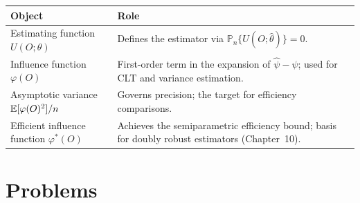 \documentclass[master.tex]{subfiles}
\begin{document}
\begin{tcolorbox}[defstyle, title={Key Objects in This Chapter}]
\begin{center}
\renewcommand{\arraystretch}{1.5}
\begin{tabular}{p{4.5cm} p{8cm}}
\toprule
\textbf{Object} & \textbf{Role} \\
\midrule
Estimating function $U(O;\theta)$
  & Defines the estimator via
    $\mathbb{P}_n\{U(O;\hat\theta)\}=0$. \\
Influence function $\varphi(O)$
  & First-order term in the expansion of
    $\hat\psi - \psi$; used for CLT and variance estimation. \\
Asymptotic variance $\mathbb{E}[\varphi(O)^2]/n$
  & Governs precision; the target for efficiency comparisons. \\
Efficient influence function $\varphi^*(O)$
  & Achieves the semiparametric efficiency bound; basis for
    doubly robust estimators (Chapter~10). \\
\bottomrule
\end{tabular}
\end{center}
\renewcommand{\arraystretch}{1}
\end{tcolorbox}

\section*{Problems}
\end{document}
